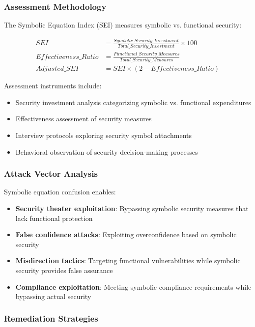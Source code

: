 \documentclass[11pt,a4paper]{article}
\begin{document}
\subsubsection{Assessment Methodology}

The Symbolic Equation Index (SEI) measures symbolic vs. functional security:

\begin{align}
SEI &= \frac{Symbolic\_Security\_Investment}{Total\_Security\_Investment} \times 100 \\
Effectiveness\_Ratio &= \frac{Functional\_Security\_Measures}{Total\_Security\_Measures} \\
Adjusted\_SEI &= SEI \times (2 - Effectiveness\_Ratio)
\end{align}

Assessment instruments include:
\begin{itemize}
\item Security investment analysis categorizing symbolic vs. functional expenditures
\item Effectiveness assessment of security measures
\item Interview protocols exploring security symbol attachments
\item Behavioral observation of security decision-making processes
\end{itemize}

\subsubsection{Attack Vector Analysis}

Symbolic equation confusion enables:

\begin{itemize}
\item \textbf{Security theater exploitation}: Bypassing symbolic security measures that lack functional protection
\item \textbf{False confidence attacks}: Exploiting overconfidence based on symbolic security
\item \textbf{Misdirection tactics}: Targeting functional vulnerabilities while symbolic security provides false assurance
\item \textbf{Compliance exploitation}: Meeting symbolic compliance requirements while bypassing actual security
\end{itemize}

\subsubsection{Remediation Strategies}
\end{document}
